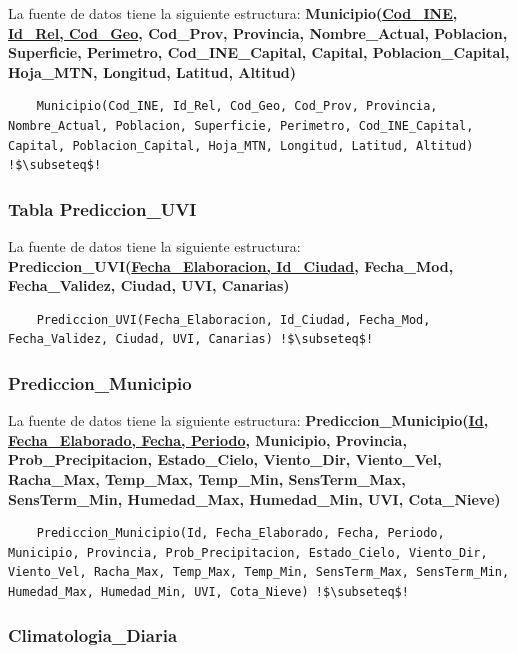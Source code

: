 \documentclass[12pt, a4paper]{article}
\begin{document}
La fuente de datos tiene la siguiente estructura:
\textbf{Municipio(\underline{Cod\_INE, Id\_Rel, Cod\_Geo}, Cod\_Prov, Provincia, Nombre\_Actual, Poblacion, Superficie, Perimetro, Cod\_INE\_Capital, Capital, Poblacion\_Capital, Hoja\_MTN, Longitud, Latitud, Altitud)}

\begin{lstlisting}
    Municipio(Cod_INE, Id_Rel, Cod_Geo, Cod_Prov, Provincia, Nombre_Actual, Poblacion, Superficie, Perimetro, Cod_INE_Capital, Capital, Poblacion_Capital, Hoja_MTN, Longitud, Latitud, Altitud) !$\subseteq$!
\end{lstlisting}

\subsubsection{Tabla Prediccion\_UVI}

La fuente de datos tiene la siguiente estructura:
\textbf{Prediccion\_UVI(\underline{Fecha\_Elaboracion, Id\_Ciudad}, Fecha\_Mod, Fecha\_Validez, Ciudad, UVI, Canarias)}

\begin{lstlisting}
    Prediccion_UVI(Fecha_Elaboracion, Id_Ciudad, Fecha_Mod, Fecha_Validez, Ciudad, UVI, Canarias) !$\subseteq$!
\end{lstlisting}

\subsubsection{Prediccion\_Municipio}

La fuente de datos tiene la siguiente estructura:
\textbf{Prediccion\_Municipio(\underline{Id, Fecha\_Elaborado, Fecha, Periodo}, Municipio, Provincia, Prob\_Precipitacion, Estado\_Cielo, Viento\_Dir, Viento\_Vel, Racha\_Max, Temp\_Max, Temp\_Min, SensTerm\_Max, SensTerm\_Min, Humedad\_Max, Humedad\_Min, UVI, Cota\_Nieve)}

\begin{lstlisting}
    Prediccion_Municipio(Id, Fecha_Elaborado, Fecha, Periodo, Municipio, Provincia, Prob_Precipitacion, Estado_Cielo, Viento_Dir, Viento_Vel, Racha_Max, Temp_Max, Temp_Min, SensTerm_Max, SensTerm_Min, Humedad_Max, Humedad_Min, UVI, Cota_Nieve) !$\subseteq$!
\end{lstlisting}

\subsubsection{Climatologia\_Diaria}
\end{document}
